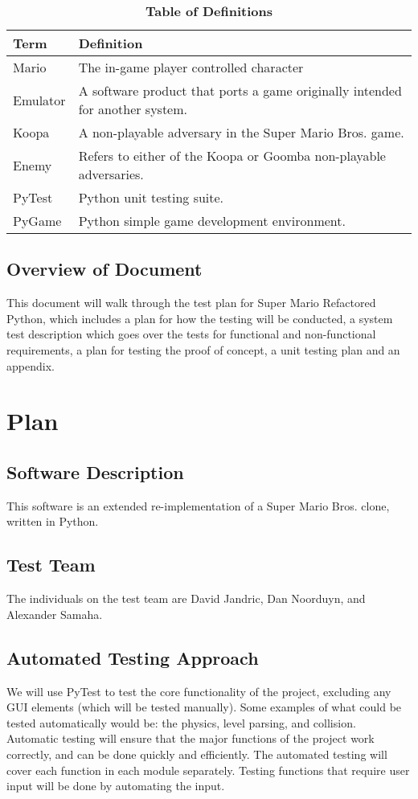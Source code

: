 \documentclass[12pt, titlepage]{article}
\begin{document}
\begin{table}[!htbp]
\caption{\textbf{Table of Definitions}} \label{Table}
\begin{tabularx}{\textwidth}{p{3cm}X}
\toprule
\textbf{Term} & \textbf{Definition}\\
\midrule
Mario & The in-game player controlled character\\
Emulator & A software product that ports a game originally intended for another system.\\
Koopa & A non-playable adversary in the Super Mario Bros. game.\\
Enemy & Refers to either of the Koopa or Goomba non-playable adversaries.\\
PyTest & Python unit testing suite.\\
PyGame & Python simple game development environment.\\
\bottomrule
\end{tabularx}
\end{table}	



\subsection{Overview of Document}
This document will walk through the test plan for Super Mario Refactored Python, 
which includes a plan for how the testing will be conducted, a system test description
which goes over the tests for functional and non-functional requirements, a plan for testing
the proof of concept, a unit testing plan and an appendix.

\section{Plan}

\subsection{Software Description}
This software is an extended re-implementation of a Super Mario Bros. clone,
written in Python.


\subsection{Test Team}
The individuals on the test team are David Jandric, Dan Noorduyn, and Alexander Samaha.



\subsection{Automated Testing Approach}
We will use PyTest to test the core functionality of the project, excluding any 
GUI elements (which will be tested manually). Some examples of what could be
tested automatically would be: the physics, level parsing, and collision. 
Automatic testing will ensure that the major functions of the project work
correctly, and can be done quickly and efficiently. The automated testing
will cover each function in each module separately. Testing functions that require
user input will be done by automating the input.
\end{document}
